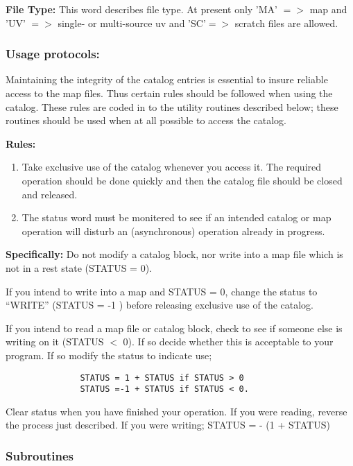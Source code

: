    {\bf File Type:}  This word describes file type.  At present only
'MA' $=>$ map and 'UV' $=>$ single- or multi-source uv and 'SC'$=>$ scratch
files are allowed.

\subsubsection{Usage protocols:}

     Maintaining the integrity of the catalog entries is essential to
insure reliable access to the map files.  Thus certain rules should be
followed when using the catalog.  These rules are coded in to the
utility routines described below; these routines should be used when
at all possible to access the catalog.

{\bf Rules:}
\begin{enumerate}
\item Take exclusive use of the catalog whenever you access it.
The required operation should be done quickly and then
the catalog file should be closed and released.
\item  The status word must be monitered to see if an intended
catalog or map operation will disturb an (asynchronous)
operation already in progress.
\end{enumerate}

{\bf Specifically:}  Do not modify a catalog block, nor write into a
map file which is not in a rest state (STATUS = 0).

   If you intend to write into a map and STATUS = 0, change the
status to ``WRITE'' (STATUS = -1 ) before releasing exclusive use
of the catalog.

   If you intend to read a map file or catalog block, check to see if
someone else is writing on it (STATUS $<$ 0).  If so decide whether
this is acceptable to your program.  If so modify the status to
indicate use;
\begin{verbatim}
               STATUS = 1 + STATUS if STATUS > 0
               STATUS =-1 + STATUS if STATUS < 0.
\end{verbatim}

   Clear status when you have finished your operation.  If you
were reading, reverse the process just described.  If you
were writing;  STATUS = - (1 + STATUS)


\subsubsection{ Subroutines}

